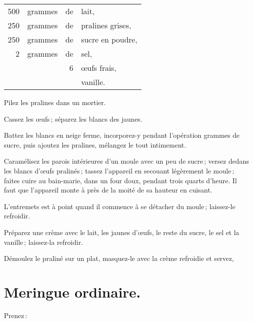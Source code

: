 \footnotesize
\begin{longtable}{rrrp{16em}}
    500 & grammes & de & lait,                                                                            \\
    250 & grammes & de & pralines grises,                                                                 \\
    250 & grammes & de & sucre en poudre,                                                                 \\
      2 & grammes & de & sel,                                                                             \\
        &         &  6 & œufs frais,                                                                      \\
        &         &    & vanille.                                                                         \\
\end{longtable}
\normalsize

Pilez les pralines dans un mortier.

Cassez les œufs ; séparez les blancs des jaunes.

Battez les blancs en neige ferme, incorporez-y pendant l'opération {\mmm}
grammes de sucre, puis ajoutez les pralines, mélangez le tout intimement.

Caramélisez les parois intérieures d'un moule avec un peu de sucre ; versez
dedans les blancs d'œufs pralinés ; tassez l'appareil en secouant légèrement le
moule ; faites cuire au bain-marie, dans un four doux, pendant trois quarts
d'heure. Il faut que l'appareil monte à près de la moité de sa hauteur en
cuisant.

L'entremets est à point quand il commence à se détacher du moule ; laissez-le
refroidir.

Préparez une crème avec le lait, les jaunes d'œufs, le reste du sucre, le sel
et la vanille ; laissez-la refroidir.

Démoulez le praliné sur un plat, masquez-le avec la crème refroidie et servez,

\section*{\centering Meringue ordinaire.}
{}

Prenez :

